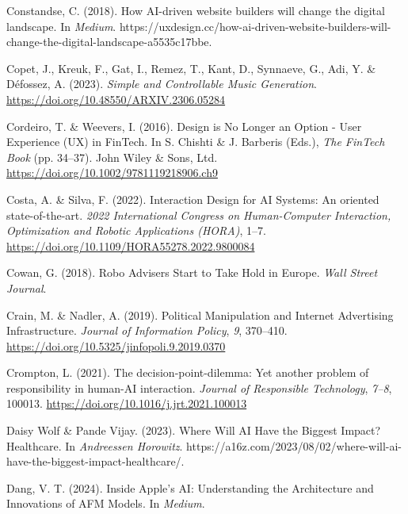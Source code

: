 \documentclass[
  letterpaper,
  DIV=11,
  numbers=noendperiod]{scrartcl}
\newlength{\cslhangindent}
\newenvironment{CSLReferences}[2] %
 {\begin{list}{}{%
  \setlength{\itemindent}{0pt}
  \setlength{\leftmargin}{0pt}
  \setlength{\parsep}{0pt}
  \ifodd #1
   \setlength{\leftmargin}{\cslhangindent}
   \setlength{\itemindent}{-1\cslhangindent}
  \fi
  \setlength{\itemsep}{#2\baselineskip}}}
 {\end{list}}
\begin{document}
\begin{CSLReferences}{1}{0}
Constandse, C. (2018). How {AI-driven} website builders will change the
digital landscape. In \emph{Medium}.
https://uxdesign.cc/how-ai-driven-website-builders-will-change-the-digital-landscape-a5535c17bbe.

Copet, J., Kreuk, F., Gat, I., Remez, T., Kant, D., Synnaeve, G., Adi,
Y. \& Défossez, A. (2023). \emph{Simple and {Controllable Music
Generation}}. \url{https://doi.org/10.48550/ARXIV.2306.05284}

Cordeiro, T. \& Weevers, I. (2016). Design is {No Longer} an {Option} -
{User Experience} ({UX}) in {FinTech}. In S. Chishti \& J. Barberis
(Eds.), \emph{The {FinTech Book}} (pp. 34--37). John Wiley \& Sons, Ltd.
\url{https://doi.org/10.1002/9781119218906.ch9}

Costa, A. \& Silva, F. (2022). Interaction {Design} for {AI Systems}:
{An} oriented state-of-the-art. \emph{2022 {International Congress} on
{Human-Computer Interaction}, {Optimization} and {Robotic Applications}
({HORA})}, 1--7. \url{https://doi.org/10.1109/HORA55278.2022.9800084}

Cowan, G. (2018). Robo {Advisers Start} to {Take Hold} in {Europe}.
\emph{Wall Street Journal}.

Crain, M. \& Nadler, A. (2019). Political {Manipulation} and {Internet
Advertising Infrastructure}. \emph{Journal of Information Policy},
\emph{9}, 370--410. \url{https://doi.org/10.5325/jinfopoli.9.2019.0370}

Crompton, L. (2021). The decision-point-dilemma: {Yet} another problem
of responsibility in human-{AI} interaction. \emph{Journal of
Responsible Technology}, \emph{7--8}, 100013.
\url{https://doi.org/10.1016/j.jrt.2021.100013}

Daisy Wolf \& Pande Vijay. (2023). Where {Will AI Have} the {Biggest
Impact}? {Healthcare}. In \emph{Andreessen Horowitz}.
https://a16z.com/2023/08/02/where-will-ai-have-the-biggest-impact-healthcare/.

Dang, V. T. (2024). Inside {Apple}'s {AI}: {Understanding} the
{Architecture} and {Innovations} of {AFM Models}. In \emph{Medium}.


\end{CSLReferences}
\end{document}
